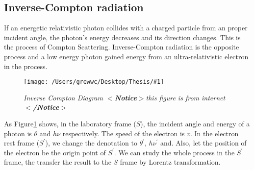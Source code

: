 \documentclass[12pt]{report}
\newcommand{\mycaption}[1]{\caption{\textit{\footnotesize #1}}}
\newcommand{\singleFig}[3]{
 \begin{figure}[!ht]
  \centering
  \texttt{[image: /Users/grewwc/Desktop/Thesis/\#1]}
  \mycaption{#3}
 \label{fig: #1}
 \end{figure}
}
\newcommand{\Notice}[1]{
  $<$\textbf{Notice}$>$#1$<$\textbf{/Notice}$>$
}
\begin{document}
          \subsection{Inverse-Compton radiation}
            If an energetic relativistic photon collides with a charged particle from an proper incident angle,
            the photon's energy decreases and its direction changes. This is the process of Compton Scattering. 
            Inverse-Compton radiation is the opposite process and a low energy photon gained energy 
            from an ultra-relativistic electron in the process. 

            \singleFig{inverse_compton}{0.45}{Inverse Compton Diagram \Notice{this figure is from internet}}
            As Figure\ref{fig: inverse_compton} shows, in the laboratory frame ($S$), the incident angle and 
            energy of a photon is $\theta$ and $h \nu$ respectively. The speed of the electron is $v$. In the 
            electron rest frame ($S^{\prime}$), we change the denotation to $\theta^{\prime}$, $h \nu^{\prime}$ and.
            Also, let the position of the electron be the origin point of $S^{\prime}$.
            We can study the whole process in the $S^{\prime}$ frame, the transfer the result 
            to the $S$ frame by Lorentz transformation. 
\end{document}
